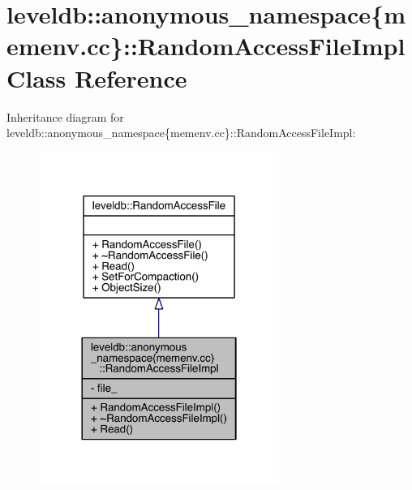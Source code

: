 \hypertarget{classleveldb_1_1anonymous__namespace_02memenv_8cc_03_1_1_random_access_file_impl}{}\section{leveldb\+:\+:anonymous\+\_\+namespace\{memenv.\+cc\}\+:\+:Random\+Access\+File\+Impl Class Reference}
\label{classleveldb_1_1anonymous__namespace_02memenv_8cc_03_1_1_random_access_file_impl}


Inheritance diagram for leveldb\+:\+:anonymous\+\_\+namespace\{memenv.\+cc\}\+:\+:Random\+Access\+File\+Impl\+:
\nopagebreak
\begin{figure}[H]
\begin{center}
\leavevmode
\includegraphics[width=222pt]{classleveldb_1_1anonymous__namespace_02memenv_8cc_03_1_1_random_access_file_impl__inherit__graph}
\end{center}
\end{figure}


